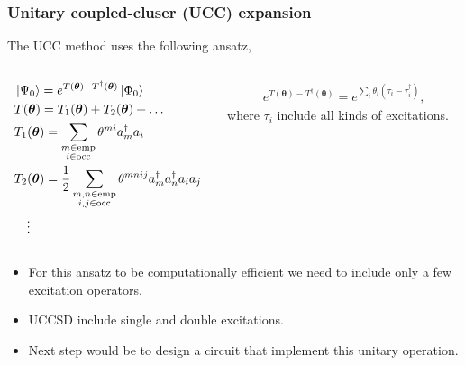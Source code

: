 \documentclass{beamer}
\renewcommand{\(}{\left(}
\renewcommand{\)}{\right)}
\renewcommand{\[}{\left[}
\renewcommand{\]}{\right]}
\begin{document}
\begin{frame}
    \frametitle{Unitary coupled-cluser (UCC) expansion}
    The UCC method uses the following ansatz, 
    \begin{columns}
        \begin{column}[]{0.55\textwidth}
            \begin{align*}
                &\ket{\Psi_0} = e^{T(\bm \theta) - T^\dagger (\bm \theta)} \ket{\Phi_0} \\ 
                &T(\bm \theta) = T_1(\bm \theta) + T_2(\bm \theta) + \dots \\ 
                & T_1(\bm \theta) = \sum_{\substack{m\in \text{emp} \\ i \in \text{occ}}} \theta^{mi} a^\dagger_m a_i \\ 
                &T_2(\bm \theta) = \frac{1}{2} \sum_{\substack{m, n\in \text{emp} \\ i, j \in \text{occ}}} \theta^{mnij} a^\dagger_m a^\dagger_n a_i a_j \\
                &  \quad \vdots
            \end{align*}
        \end{column}
        \begin{column}[b]{0.45\textwidth}
            \begin{align*}
                e^{T(\bm \theta) - T^\dagger (\bm \theta)} = e^{\sum_i \theta_i (\tau_i - \tau^\dagger_i)},
            \end{align*}
            where $\tau_i$ include all kinds of excitations. 
        \end{column}
    \end{columns}
   \pause
    \begin{itemize}
        \item For this ansatz to be computationally efficient we need to include only a few excitation operators. 
        \item UCCSD include single and double excitations.
        \item Next step would be to design a circuit that implement this unitary operation. 
    \end{itemize}
\end{frame}
\end{document}
